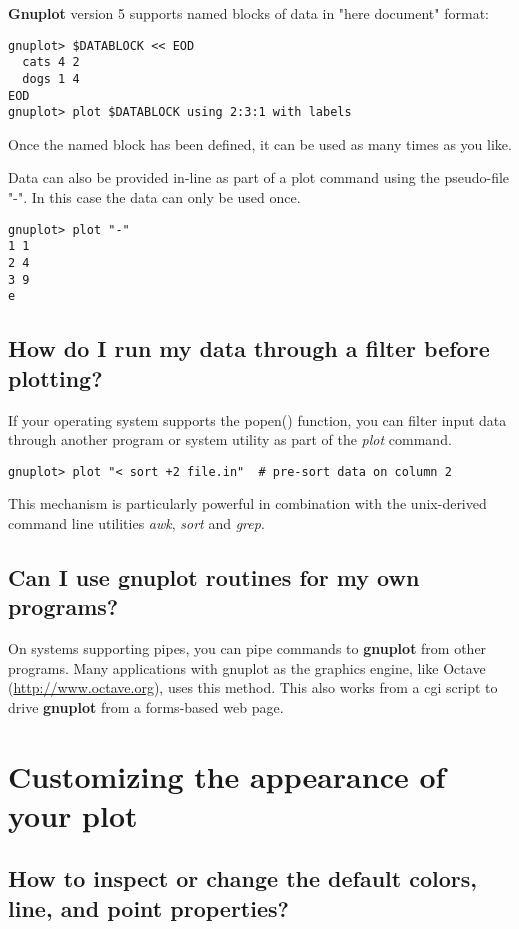 \documentclass[letter,11pt]{article}
\def\http#1{{\small\href{http://#1}{\url{http://#1}}}}
\newcommand{\http}[1]%
            {\htmladdnormallink{\latex{\url{http://#1}}%
                    \html{\textit{http://#1}}}%
                {http://#1}%
            }
\newcommand{\gnuplot}{\textbf{gnuplot }}
\newcommand{\Gnuplot}{\textbf{Gnuplot }}
\begin{document}
{\Gnuplot version 5 supports named blocks of data in "here document" format:
\small
\begin{verbatim}
gnuplot> $DATABLOCK << EOD
  cats 4 2
  dogs 1 4
EOD
gnuplot> plot $DATABLOCK using 2:3:1 with labels
\end{verbatim}
\normalsize
Once the named block has been defined, it can be used as many times
as you like.

Data can also be provided in-line as part of a plot command using the
pseudo-file "-".  In this case the data can only be used once.

\small
\begin{verbatim}
gnuplot> plot "-"
1 1
2 4
3 9
e
\end{verbatim}
\normalsize

\subsection{How do I run my data through a filter before plotting?}

If your operating system supports the popen() function, you
can filter input data through another program or system utility
as part of the {\em plot} command.

\small
\begin{verbatim}
gnuplot> plot "< sort +2 file.in"  # pre-sort data on column 2
\end{verbatim}
\normalsize

This mechanism is particularly powerful in combination with the
unix-derived command line utilities {\em awk}, {\em sort} and {\em grep}.

\subsection{Can I use \gnuplot routines for my own programs?}

On systems supporting pipes, you can pipe commands to \gnuplot from other
programs. Many applications with gnuplot as the graphics engine, like Octave
(\http{www.octave.org}), uses this method. This also works from a cgi script to
drive \gnuplot from a forms-based web page.


\section{Customizing the appearance of your plot}

\subsection{How to inspect or change the default colors, line, and point properties?}

}
\end{document}
